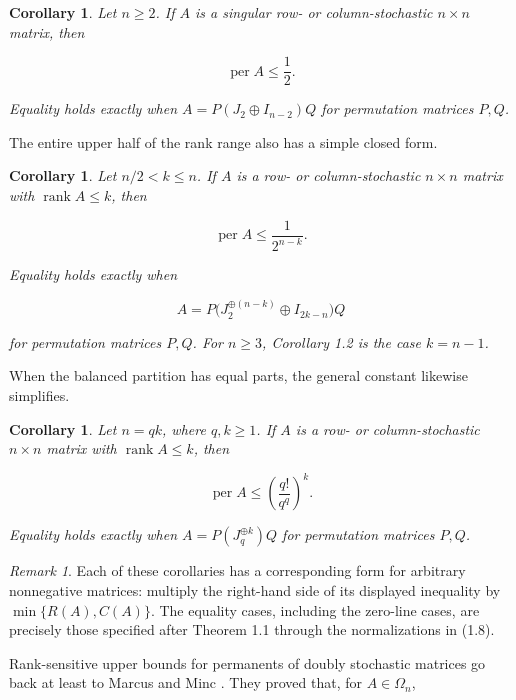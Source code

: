\documentclass[11pt]{article}
\newtheorem{corollary}[theorem]{Corollary}
\theoremstyle{remark}
\newtheorem*{remark}{Remark}
\begin{document}
\begin{corollary}
Let \(n\geq2\). If \(A\) is a
singular row- or column-stochastic \(n\times n\) matrix, then

\[
 \operatorname{per}A\leq\frac12.                           \tag{1.9}
\]

Equality holds exactly when \(A=P(J_2\oplus I_{n-2})Q\) for permutation
matrices \(P,Q\).
\end{corollary}

The entire upper half of the rank range also has a simple closed form.

\begin{corollary}
Let \(n/2<k\leq n\). If \(A\)
is a row- or column-stochastic \(n\times n\) matrix with
\(\operatorname{rank}A\leq k\), then

\[
 \operatorname{per}A\leq\frac{1}{2^{n-k}}.                \tag{1.10}
\]

Equality holds exactly when

\[
 A=P\bigl(J_2^{\oplus(n-k)}\oplus I_{2k-n}\bigr)Q
\]

for permutation matrices \(P,Q\). For \(n\geq3\), Corollary 1.2 is the
case \(k=n-1\).
\end{corollary}

When the balanced partition has equal parts, the general constant likewise
simplifies.

\begin{corollary}
Let \(n=qk\), where \(q,k\geq1\). If
\(A\) is a row- or column-stochastic \(n\times n\) matrix with
\(\operatorname{rank}A\leq k\), then

\[
 \operatorname{per}A
 \leq \left(\frac{q!}{q^q}\right)^k.                      \tag{1.11}
\]

Equality holds exactly when \(A=P(J_q^{\oplus k})Q\) for permutation
matrices \(P,Q\).
\end{corollary}

\begin{remark}
Each of these
corollaries has a corresponding form for arbitrary nonnegative matrices:
multiply the right-hand side of its displayed inequality by
\(\min\{R(A),C(A)\}\). The equality cases, including the zero-line cases,
are precisely those specified after Theorem 1.1 through the normalizations
in (1.8).
\end{remark}

Rank-sensitive upper bounds for permanents of doubly stochastic matrices
go back at least to Marcus and Minc
\cite[Corollaries~3.1 and~3.3]{marcusminc1965}. They
proved that, for \(A\in\Omega_n\),
\end{document}
